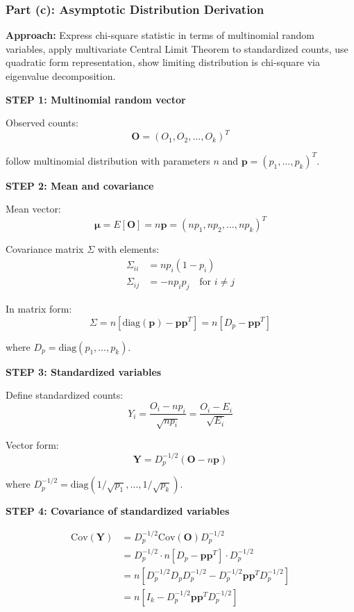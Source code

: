 \documentclass[12pt]{article}
\begin{document}
\subsubsection{Part (c): Asymptotic Distribution Derivation}

\begin{solution}

\textbf{Approach:} Express chi-square statistic in terms of multinomial random variables, apply multivariate Central Limit Theorem to standardized counts, use quadratic form representation, show limiting distribution is chi-square via eigenvalue decomposition.

\textbf{STEP 1: Multinomial random vector}

Observed counts:
\[
\mathbf{O} = (O_1, O_2, \ldots, O_k)^T
\]

follow multinomial distribution with parameters $n$ and $\mathbf{p} = (p_1, \ldots, p_k)^T$.

\textbf{STEP 2: Mean and covariance}

Mean vector:
\[
\boldsymbol{\mu} = E[\mathbf{O}] = n\mathbf{p} = (np_1, np_2, \ldots, np_k)^T
\]

Covariance matrix $\Sigma$ with elements:
\begin{align*}
\Sigma_{ii} &= np_i(1 - p_i) \\
\Sigma_{ij} &= -np_ip_j \quad \text{for } i \neq j
\end{align*}

In matrix form:
\[
\Sigma = n[\text{diag}(\mathbf{p}) - \mathbf{p}\mathbf{p}^T] = n[D_p - \mathbf{p}\mathbf{p}^T]
\]

where $D_p = \text{diag}(p_1, \ldots, p_k)$.

\textbf{STEP 3: Standardized variables}

Define standardized counts:
\[
Y_i = \frac{O_i - np_i}{\sqrt{np_i}} = \frac{O_i - E_i}{\sqrt{E_i}}
\]

Vector form:
\[
\mathbf{Y} = D_p^{-1/2}(\mathbf{O} - n\mathbf{p})
\]

where $D_p^{-1/2} = \text{diag}(1/\sqrt{p_1}, \ldots, 1/\sqrt{p_k})$.

\textbf{STEP 4: Covariance of standardized variables}

\begin{align*}
\text{Cov}(\mathbf{Y}) &= D_p^{-1/2}\text{Cov}(\mathbf{O})D_p^{-1/2} \\
&= D_p^{-1/2} \cdot n[D_p - \mathbf{p}\mathbf{p}^T] \cdot D_p^{-1/2} \\
&= n[D_p^{-1/2}D_pD_p^{-1/2} - D_p^{-1/2}\mathbf{p}\mathbf{p}^TD_p^{-1/2}] \\
&= n[I_k - D_p^{-1/2}\mathbf{p}\mathbf{p}^TD_p^{-1/2}]
\end{align*}


\end{solution}
\end{document}
